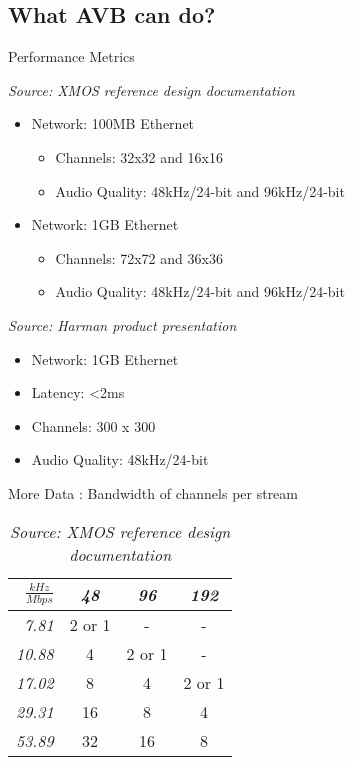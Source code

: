 \documentclass{beamer}
\begin{document}

\subsection{What AVB can do?}

\begin{frame}{ Performance Metrics }

\emph{Source: XMOS reference design documentation}
\begin{itemize}
	\item Network: 100MB Ethernet
	\begin{itemize}
		\item Channels: 32x32 and 16x16
		\item Audio Quality: 48kHz/24-bit and 96kHz/24-bit
	\end{itemize}
	\item Network: 1GB Ethernet
	\begin{itemize}
		\item Channels: 72x72 and 36x36
		\item Audio Quality: 48kHz/24-bit and 96kHz/24-bit
	\end{itemize}
\end{itemize}

\emph{Source: Harman product presentation}
\begin{itemize}
	\item Network: 1GB Ethernet
	\item Latency: <2ms
	\item Channels: 300 x 300
	\item Audio Quality: 48kHz/24-bit
\end{itemize}


\end{frame}


\begin{frame}{ More Data : Bandwidth of channels per stream }
\begin{table}
\caption{\emph{Source: XMOS reference design documentation}}

\begin{tabular} {| r || c | c | c | } \hline
$\frac{kHz}{Mbps}$ & \emph{48} & \emph{96} & \emph{192} \\ \hline \hline
\emph{7.81} & 2 or 1 &- &- \\ \hline
     \emph{10.88} & 4 & 2 or 1  &- \\ \hline
     \emph{17.02} & 8 & 4 & 2 or 1 \\ \hline
     \emph{29.31} & 16 & 8 & 4 \\ \hline
     \emph{53.89} & 32 & 16 & 8 \\ \hline
\end{tabular}

\end{table}

\end{frame}
\end{document}
